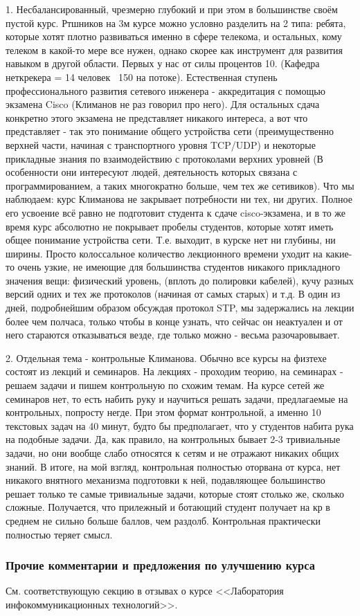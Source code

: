             \begin{commentbox} 
                1. Несбалансированный, чрезмерно глубокий и при этом в большинстве своём пустой курс. Ртшников на 3м курсе можно условно разделить на 2 типа: ребята, которые хотят плотно развиваться именно в сфере телекома, и остальных, кому телеком в какой-то мере все нужен, однако скорее как инструмент для развития навыком в другой области. Первых у нас от силы процентов 10. (Кафедра неткрекера = 14 человек ~150 на потоке). Естественная ступень профессионального развития сетевого инженера - аккредитация с помощью экзамена Cisco (Климанов не раз говорил про него). Для остальных сдача конкретно этого экзамена не представляет никакого интереса, а вот что представляет - так это понимание общего устройства сети (преимущественно верхней части, начиная с транспортного уровня TCP/UDP) и некоторые прикладные знания по взаимодействию с протоколами верхних уровней (В особенности они интересуют людей, деятельность которых связана с программированием, а таких многократно больше, чем тех же сетивиков). Что мы наблюдаем: курс Климанова не закрывает потребности ни тех, ни других. Полное его усвоение всё равно не подготовит студента к сдаче cisco-экзамена, и в то же время курс абсолютно не покрывает пробелы студентов, которые хотят иметь общее понимание устройства сети. Т.е. выходит, в курске нет ни глубины, ни ширины. Просто колоссальное количество лекционного времени уходит на какие-то очень узкие, не имеющие для большинства студентов никакого прикладного значения вещи: физический уровень, (вплоть до полировки кабелей), кучу разных версий одних и тех же протоколов (начиная от самых старых) и т.д. В один из дней, подробнейшим образом обсуждая протокол STP, мы задержались на лекции более чем полчаса, только чтобы в конце узнать, что сейчас он неактуален и от него стараются отказываться везде, где только можно - весьма разочаровывает. 
        
                2. Отдельная тема - контрольные Климанова. Обычно все курсы на физтехе состоят из лекций и семинаров. На лекциях - проходим теорию, на семинарах - решаем задачи и пишем контрольную по схожим темам. На курсе сетей же семинаров нет, то есть набить руку и научиться решать задачи, предлагаемые на контрольных, попросту негде. При этом формат контрольной, а именно 10 текстовых задач на 40 минут, будто бы предполагает, что у студентов набита рука на подобные задачи. Да, как правило, на контрольных бывает 2-3 тривиальные задачи, но они вообще слабо относятся к сетям и не отражают никаких общих знаний. В итоге, на мой взгляд, контрольная полностью оторвана от курса, нет никакого внятного механизма подготовки к ней, подавляющее большинство решает только те самые тривиальные задачи, которые стоят столько же, сколько сложные. Получается, что прилежный и ботающий студент получает на кр в среднем не сильно больше баллов, чем раздолб. Контрольная практически полностью теряет смысл. 
            \end{commentbox}


        \subsubsection{Прочие комментарии и предложения по улучшению курса}
            См. соответствующую секцию в отзывах о курсе <<Лаборатория инфокоммуникационных технологий>>.
